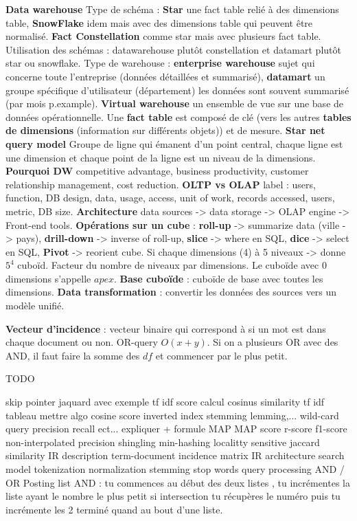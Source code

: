 \documentclass[9pt,a4paper]{report}
\begin{document}
\textbf{Data warehouse} Type de schéma : \textbf{Star} une fact table relié à des dimensions table, \textbf{SnowFlake} idem mais avec des dimensions table qui peuvent être normalisé. \textbf{ Fact Constellation} comme star mais avec plusieurs fact table. Utilisation des schémas : datawarehouse plutôt constellation et datamart plutôt star ou snowflake. Type de warehouse : \textbf{enterprise warehouse} sujet qui concerne toute l'entreprise (données détaillées et summarisé), \textbf{datamart} un groupe spécifique d'utilisateur (département) les données sont souvent summarisé (par mois p.example). \textbf{Virtual warehouse} un ensemble de vue sur une base de données opérationnelle. Une \textbf{fact table} est composé de clé (vers les autres \textbf{tables de dimensions} (information sur différents objets)) et de mesure. \textbf{Star net query model} Groupe de ligne qui émanent d'un point central, chaque ligne est une dimension et chaque point de la ligne est un niveau de la dimensions. \textbf{Pourquoi DW} competitive advantage, business productivity, customer relationship management, cost reduction. \textbf{OLTP vs OLAP} label : users, function, DB design, data, usage, access, unit of work, records accessed, users, metric, DB size. \textbf{Architecture} data sources -> data storage -> OLAP engine -> Front-end tools. \textbf{Opérations sur un cube} : \textbf{roll-up} -> summarize data (ville -> pays), \textbf{drill-down} -> inverse of roll-up, \textbf{slice} -> where en SQL, \textbf{dice} -> select en SQL, \textbf{Pivot} -> reorient cube. Si chaque dimensions (4) à 5 niveaux -> donne $5^4$ cuboïd. Facteur du nombre de niveaux par dimensions. Le cuboïde avec $0$ dimensions s'appelle $apex$. \textbf{Base cuboïde} : cuboïde de base avec toutes les dimensions. \textbf{Data transformation} : convertir les données des sources vers un modèle unifié.

\newpage

\textbf{Vecteur d'incidence} : vecteur binaire qui correspond à si un mot est dans chaque document ou non. OR-query $O(x+y)$. Si on a plusieurs OR avec des AND, il faut faire la somme des $df$ et commencer par le plus petit. 

TODO

skip pointer
jaquard avec exemple
tf idf
score calcul
cosinus similarity
tf idf tableau
mettre algo cosine score
inverted index
stemming
lemming,...
wild-card query
precision recall ect... expliquer + formule
MAP
MAP score
r-score
f1-score
non-interpolated precision
shingling
min-hashing
localitty sensitive
jaccard similarity
IR description
term-document incidence matrix
IR architecture
search model
tokenization
normalization
stemming
stop words
query processing AND / OR
Posting list
AND : tu commences au début des deux listes , tu incrémentes la liste ayant le nombre le plus petit si intersection tu récupères le numéro puis tu incrémente les 2 terminé quand au bout d’une liste.
\end{document}
